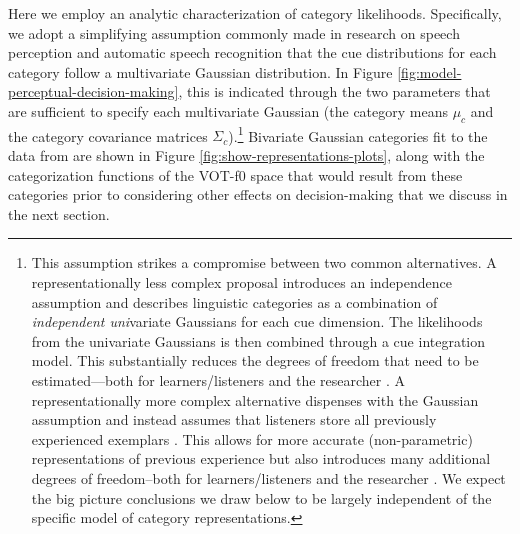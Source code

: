 \documentclass[
  11pt,
  man,floatsintext]{apa6}
\begin{document}
Here we employ an analytic characterization of category likelihoods. Specifically, we adopt a simplifying assumption commonly made in research on speech perception \autocite{clayards2008,feldman2009,kleinschmidt-jaeger2015,norris-mcqueen2008} and automatic speech recognition \autocite{jurafsky-martin2000} that the cue distributions for each category follow a multivariate Gaussian distribution. In Figure \ref{fig:model-perceptual-decision-making}, this is indicated through the two parameters that are sufficient to specify each multivariate Gaussian (the category means \(\mu_c\) and the category covariance matrices \(\Sigma_c\)).\footnote{\label{fn:alternative-representational-changes} This assumption strikes a compromise between two common alternatives. A representationally less complex proposal introduces an independence assumption and describes linguistic categories as a combination of \emph{independent uni}variate Gaussians for each cue dimension. The likelihoods from the univariate Gaussians is then combined through a cue integration model. This substantially reduces the degrees of freedom that need to be estimated---both for learners/listeners and the researcher \autocite[see][]{toscano-mcmurray2010}. A representationally more complex alternative dispenses with the Gaussian assumption and instead assumes that listeners store all previously experienced exemplars \autocite[or some pruned set of exemplars,][]{pierrehumbert2001}. This allows for more accurate (non-parametric) representations of previous experience but also introduces many additional degrees of freedom--both for learners/listeners and the researcher \autocite[for discussion, see][]{apfelbaum-mcmurray2015}. We expect the big picture conclusions we draw below to be largely independent of the specific model of category representations.} Bivariate Gaussian categories fit to the data from \textcite{chodroff-wilson2018} are shown in Figure \ref{fig:show-representations-plots}, along with the categorization functions of the VOT-f0 space that would result from these categories prior to considering other effects on decision-making that we discuss in the next section.
\end{document}

